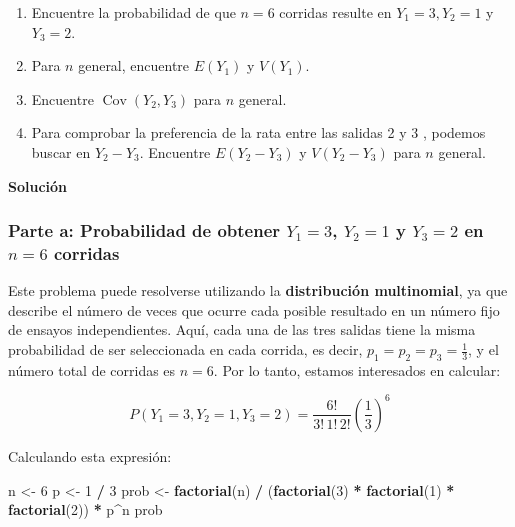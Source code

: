\documentclass[
]{article}
\newenvironment{Shaded}{\begin{snugshade}}{\end{snugshade}}
\newcommand{\DecValTok}[1]{\textcolor[rgb]{0.00,0.00,0.81}{#1}}
\newcommand{\FunctionTok}[1]{\textcolor[rgb]{0.13,0.29,0.53}{\textbf{#1}}}
\newcommand{\NormalTok}[1]{#1}
\newcommand{\OtherTok}[1]{\textcolor[rgb]{0.56,0.35,0.01}{#1}}
\newcommand{\SpecialCharTok}[1]{\textcolor[rgb]{0.81,0.36,0.00}{\textbf{#1}}}
\providecommand{\tightlist}{%
  \setlength{\itemsep}{0pt}\setlength{\parskip}{0pt}}
\begin{document}
\begin{enumerate}
\def\labelenumi{\arabic{enumi}.}
\tightlist
\item
  Encuentre la probabilidad de que \(n=6\) corridas resulte en \(Y_{1}=3, Y_{2}=1\) y \(Y_{3}=2\).
\item
  Para \(n\) general, encuentre \(E\left(Y_{1}\right)\) y \(V\left(Y_{1}\right)\).
\item
  Encuentre \(\operatorname{Cov}\left(Y_{2}, Y_{3}\right)\) para \(n\) general.
\item
  Para comprobar la preferencia de la rata entre las salidas 2 y 3 , podemos buscar en \(Y_{2}-Y_{3}\). Encuentre \(E\left(Y_{2}-Y_{3}\right)\) y \(V\left(Y_{2}-Y_{3}\right)\) para \(n\) general.
\end{enumerate}

\textbf{Solución}

\subsubsection{\texorpdfstring{Parte a: Probabilidad de obtener \(Y_1 = 3\), \(Y_2 = 1\) y \(Y_3 = 2\) en \(n = 6\) corridas}{Parte a: Probabilidad de obtener Y\_1 = 3, Y\_2 = 1 y Y\_3 = 2 en n = 6 corridas}}\label{parte-a-probabilidad-de-obtener-y_1-3-y_2-1-y-y_3-2-en-n-6-corridas}

Este problema puede resolverse utilizando la \textbf{distribución multinomial}, ya que describe el número de veces que ocurre cada posible resultado en un número fijo de ensayos independientes. Aquí, cada una de las tres salidas tiene la misma probabilidad de ser seleccionada en cada corrida, es decir, \(p_1 = p_2 = p_3 = \frac{1}{3}\), y el número total de corridas es \(n = 6\). Por lo tanto, estamos interesados en calcular:

\[
P(Y_1 = 3, Y_2 = 1, Y_3 = 2) = \frac{6!}{3! \, 1! \, 2!} \left( \frac{1}{3} \right)^6
\]

Calculando esta expresión:

\begin{Shaded}
\begin{Highlighting}[]
\NormalTok{n }\OtherTok{\textless{}{-}} \DecValTok{6}
\NormalTok{p }\OtherTok{\textless{}{-}} \DecValTok{1} \SpecialCharTok{/} \DecValTok{3}
\NormalTok{prob }\OtherTok{\textless{}{-}} \FunctionTok{factorial}\NormalTok{(n) }\SpecialCharTok{/}\NormalTok{ (}\FunctionTok{factorial}\NormalTok{(}\DecValTok{3}\NormalTok{) }\SpecialCharTok{*} \FunctionTok{factorial}\NormalTok{(}\DecValTok{1}\NormalTok{) }\SpecialCharTok{*} \FunctionTok{factorial}\NormalTok{(}\DecValTok{2}\NormalTok{)) }\SpecialCharTok{*}\NormalTok{ p}\SpecialCharTok{\^{}}\NormalTok{n}
\NormalTok{prob}
\end{Highlighting}
\end{Shaded}
\end{document}
